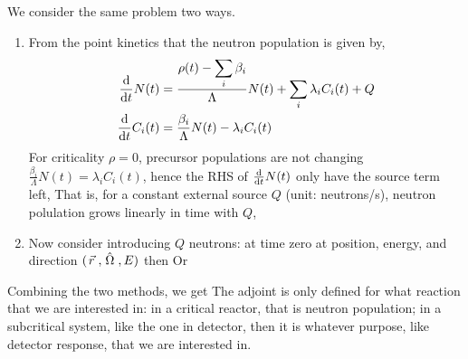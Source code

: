 \documentclass{school-22.211-notes}
\begin{document}
\clearpage
{}
We consider the same problem two ways.
\begin{enumerate}
\item From the point kinetics that the neutron population is given by, 
\begin{align}
  \frac{\mathrm{d}}{\mathrm{d}t} N(t) &= \frac{\rho(t) - \displaystyle\sum_i \beta_i}{\Lambda} N(t) + \displaystyle\sum_i \lambda_i C_i(t) + Q \\
  \frac{\mathrm{d}}{\mathrm{d}t} C_i (t) &= \frac{\beta_i}{\Lambda} N(t) - \lambda_i C_i (t)
\end{align}
For criticality $\rho=0$, precursor populations are not changing $\frac{\beta_i}{\Lambda}N(t) = \lambda_i C_i(t)$, hence the RHS of $\frac{\mathrm{d}}{\mathrm{d}t} N(t)$ only have the source term left, 
That is, for a constant external source $Q$ (unit: neutrons/s), neutron polulation grows linearly in time with $Q$,

\item Now consider introducing $Q$ neutrons: at time zero at position, energy, and direction $(\left.\vec{r}\right., \left. \hat{\Omega} \right., E)$ then
Or 
\end{enumerate}

Combining the two methods, we get
 The adjoint is only defined for what reaction that we are interested in: in a critical reactor, that is neutron population; in a subcritical system, like the one in detector, then it is whatever purpose, like detector response, that we are interested in. 
\end{document}
